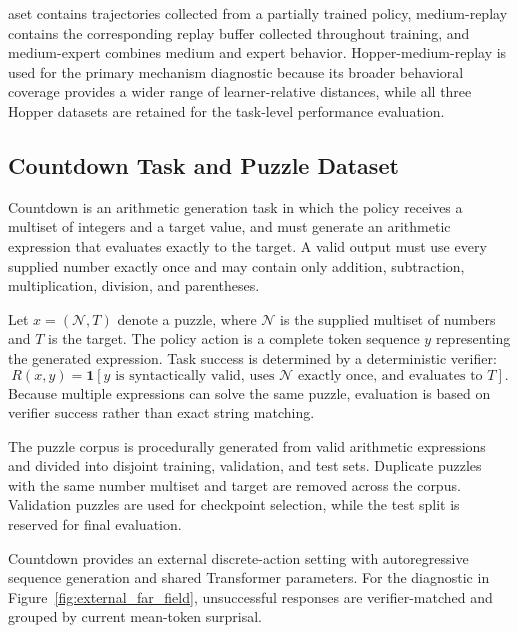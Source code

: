 aset contains trajectories collected from a
partially trained policy, medium-replay contains the corresponding replay
buffer collected throughout training, and medium-expert combines medium
and expert behavior. Hopper-medium-replay is used for the primary mechanism
diagnostic because its broader behavioral coverage provides a wider range of
learner-relative distances, while all three Hopper datasets are retained for
the task-level performance evaluation.

\subsection{Countdown Task and Puzzle Dataset}
\label{app:countdown_dataset}

Countdown is an arithmetic generation task in which the policy receives
a multiset of integers and a target value, and must generate an
arithmetic expression that evaluates exactly to the target. A valid
output must use every supplied number exactly once and may contain only
addition, subtraction, multiplication, division, and parentheses.

Let
$x=(\mathcal N,T)$
denote a puzzle, where
$\mathcal N$
is the supplied multiset of numbers and
$T$
is the target. The policy action is a complete token sequence
$y$ representing the generated expression. Task success is determined
by a deterministic verifier:
\begin{equation}
    R(x,y)
    =
    \mathbf 1
    \left[
        y
        \text{ is syntactically valid, uses }
        \mathcal N
        \text{ exactly once, and evaluates to }T
    \right].
    \label{eq:countdown_reward}
\end{equation}
Because multiple expressions can solve the same puzzle, evaluation is
based on verifier success rather than exact string matching.

The puzzle corpus is procedurally generated from valid arithmetic
expressions and divided into disjoint training, validation, and test
sets. Duplicate puzzles with the same number multiset and target are
removed across the corpus. Validation puzzles are used for checkpoint
selection, while the test split is reserved for final evaluation.

Countdown provides an external discrete-action setting with
autoregressive sequence generation and shared Transformer parameters.
For the diagnostic in Figure~\ref{fig:external_far_field}, unsuccessful
responses are verifier-matched and grouped by current mean-token surprisal.

